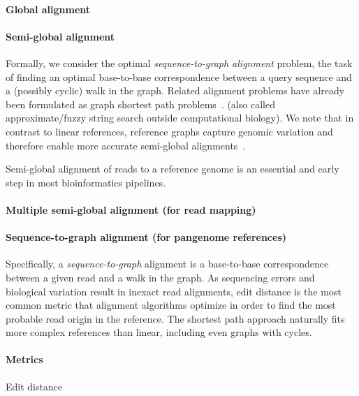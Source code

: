\paragraph{Global alignment}

\paragraph{Semi-global alignment}
Formally, we consider the optimal \emph{sequence-to-graph alignment} problem,
the task of finding an optimal base-to-base correspondence between a query
sequence and a (possibly cyclic) walk in the graph. Related alignment problems
have already been formulated as graph shortest path
problems~\cite{jain_complexity_2019}.
 (also called approximate/fuzzy string search outside computational
biology).
We note that in contrast to linear references, reference graphs capture genomic
variation and therefore enable more accurate semi-global
alignments~\citep{garrison_variation_2018}.

Semi-global alignment of reads to a reference genome is an essential and early
step in most bioinformatics pipelines.

\paragraph{Multiple semi-global alignment (for read mapping)}

\paragraph{Sequence-to-graph alignment (for pangenome references)}
Specifically, a \emph{sequence-to-graph} alignment is a base-to-base
correspondence between a given read and a walk in the graph. As sequencing
errors and biological variation result in inexact read alignments, edit distance
is the most common metric that alignment algorithms optimize in order to find
the most probable read origin in the reference. The shortest path approach
naturally fits more complex references than linear, including even graphs with
cycles.

\paragraph{Metrics}
Edit distance
